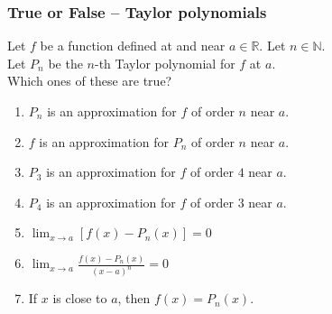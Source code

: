 \documentclass[14pt]{beamer}
\begin{document}
\begin{frame}[t]
	\fontsize{13}{13}\selectfont
	\frametitle{True or False -- Taylor polynomials}

	Let $f$ be a function defined at and near $a \in \mathbb{R}$. Let
	$\displaystyle n \in \mathbb{N}$. \\ Let $P_{n}$ be the $n$-th Taylor polynomial
	for $f$ at $a$. \\ Which ones of these are true?

	\begin{enumerate}
		\item $P_{n}$ is an approximation for $f$ of order $n$ near $a$.
			\vfill

		\item $f$ is an approximation for $P_{n}$ of order $n$ near $a$.
			\vfill

		\item $P_{3}$ is an approximation for $f$ of order $4$ near $a$.
			\vfill

		\item $P_{4}$ is an approximation for $f$ of order $3$ near $a$.
			\vfill

		\item $\displaystyle \lim_{x \to a}\left[ f(x) - P_{n}(x) \right] = 0$
			\vfill

		\item $\displaystyle \lim_{x \to a}\frac{f(x) - P_{n}(x)}{(x-a)^{n}}= 0$
			\vfill

		\item If $x$ is close to $a$, then $f(x) = P_{n}(x)$.
			\vfill
	\end{enumerate}
\end{frame}
\end{document}
